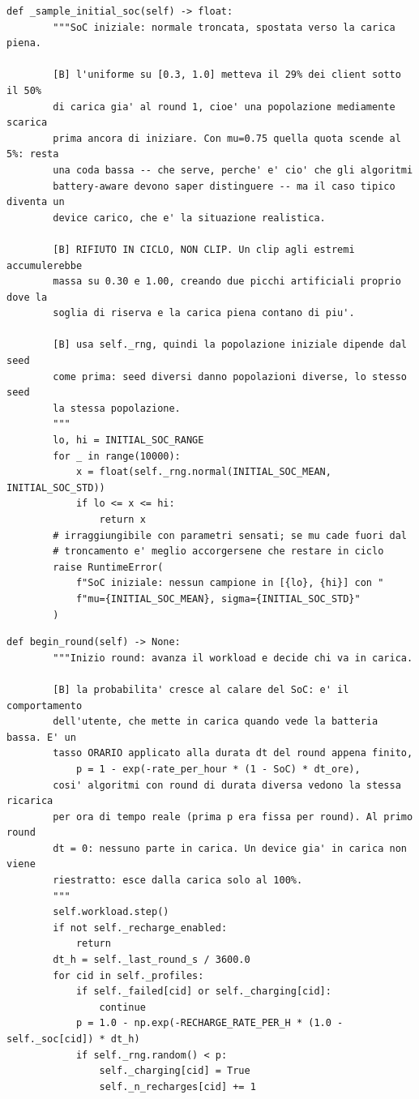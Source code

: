 \documentclass[11pt,a4paper]{article}
\begin{document}
\begin{lstlisting}[style=py,firstnumber=191,caption={\texttt{tesifl/device/world\_state.py}, lines 191--219}]
    def _sample_initial_soc(self) -> float:
        """SoC iniziale: normale troncata, spostata verso la carica piena.

        [B] l'uniforme su [0.3, 1.0] metteva il 29% dei client sotto il 50%
        di carica gia' al round 1, cioe' una popolazione mediamente scarica
        prima ancora di iniziare. Con mu=0.75 quella quota scende al 5%: resta
        una coda bassa -- che serve, perche' e' cio' che gli algoritmi
        battery-aware devono saper distinguere -- ma il caso tipico diventa un
        device carico, che e' la situazione realistica.

        [B] RIFIUTO IN CICLO, NON CLIP. Un clip agli estremi accumulerebbe
        massa su 0.30 e 1.00, creando due picchi artificiali proprio dove la
        soglia di riserva e la carica piena contano di piu'.

        [B] usa self._rng, quindi la popolazione iniziale dipende dal seed
        come prima: seed diversi danno popolazioni diverse, lo stesso seed
        la stessa popolazione.
        """
        lo, hi = INITIAL_SOC_RANGE
        for _ in range(10000):
            x = float(self._rng.normal(INITIAL_SOC_MEAN, INITIAL_SOC_STD))
            if lo <= x <= hi:
                return x
        # irraggiungibile con parametri sensati; se mu cade fuori dal
        # troncamento e' meglio accorgersene che restare in ciclo
        raise RuntimeError(
            f"SoC iniziale: nessun campione in [{lo}, {hi}] con "
            f"mu={INITIAL_SOC_MEAN}, sigma={INITIAL_SOC_STD}"
        )
\end{lstlisting}

\begin{lstlisting}[style=py,firstnumber=298,caption={\texttt{tesifl/device/world\_state.py}, lines 298--320}]
    def begin_round(self) -> None:
        """Inizio round: avanza il workload e decide chi va in carica.

        [B] la probabilita' cresce al calare del SoC: e' il comportamento
        dell'utente, che mette in carica quando vede la batteria bassa. E' un
        tasso ORARIO applicato alla durata dt del round appena finito,
            p = 1 - exp(-rate_per_hour * (1 - SoC) * dt_ore),
        cosi' algoritmi con round di durata diversa vedono la stessa ricarica
        per ora di tempo reale (prima p era fissa per round). Al primo round
        dt = 0: nessuno parte in carica. Un device gia' in carica non viene
        riestratto: esce dalla carica solo al 100%.
        """
        self.workload.step()
        if not self._recharge_enabled:
            return
        dt_h = self._last_round_s / 3600.0
        for cid in self._profiles:
            if self._failed[cid] or self._charging[cid]:
                continue
            p = 1.0 - np.exp(-RECHARGE_RATE_PER_H * (1.0 - self._soc[cid]) * dt_h)
            if self._rng.random() < p:
                self._charging[cid] = True
                self._n_recharges[cid] += 1
\end{lstlisting}
\end{document}
